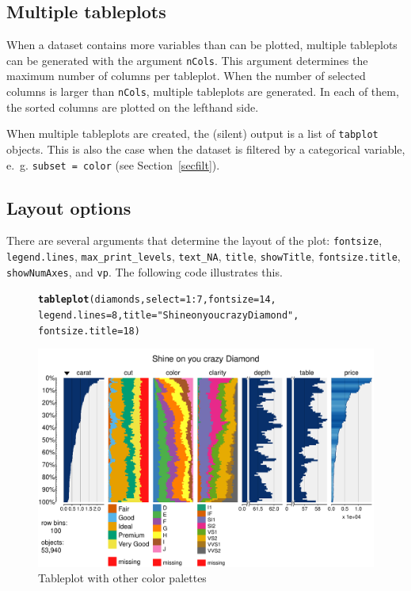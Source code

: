 \documentclass[11pt, fleqn, a4paper]{article}\usepackage{graphicx, color}
\makeatletter
\def\maxwidth{ %
  \ifdim\Gin@nat@width>\linewidth
    \linewidth
  \else
    \Gin@nat@width
  \fi
}
\newcommand{\hlfunctioncall}[1]{\textcolor[rgb]{0.501960784313725,0,0.329411764705882}{\textbf{#1}}}%
\newcommand{\hlstring}[1]{\textcolor[rgb]{0.6,0.6,1}{#1}}%
\newenvironment{kframe}{%
 \def\at@end@of@kframe{}%
 \ifinner\ifhmode%
  \def\at@end@of@kframe{\end{minipage}}%
  \begin{minipage}{\columnwidth}%
 \fi\fi%
 \def\FrameCommand##1{\hskip\@totalleftmargin \hskip-\fboxsep
 \colorbox{shadecolor}{##1}\hskip-\fboxsep
     \hskip-\linewidth \hskip-\@totalleftmargin \hskip\columnwidth}%
 \MakeFramed {\advance\hsize-\width
   \@totalleftmargin\z@ \linewidth\hsize
   \@setminipage}}%
 {\par\unskip\endMakeFramed%
 \at@end@of@kframe}
\newenvironment{knitrout}{}{} %
\makeatother
\begin{document}
\subsection{Multiple tableplots}\label{secmult}

When a dataset contains more variables than can be plotted, multiple tableplots can be generated with the argument {\tt nCols}. This argument determines the maximum number of columns per tableplot. When the number of selected columns is larger than {\tt nCols}, multiple tableplots are generated. In each of them, the sorted columns are plotted on the lefthand side. 

When multiple tableplots are created, the (silent) output is a list of {\tt tabplot} objects. This is also the case when the dataset is filtered by a categorical variable, e.~g. {\tt subset = color}
(see Section~\ref{secfilt}).

\subsection{Layout options}\label{seclay}
There are several arguments that determine the layout of the plot:
{\tt fontsize}, {\tt legend.lines}, {\tt max_print_levels}, {\tt text_NA}, {\tt title}, {\tt showTitle}, {\tt fontsize.title}, {\tt showNumAxes}, and {\tt vp}. The following code illustrates this.

\begin{figure}[htp]
\begin{knitrout}
\color{fgcolor}\begin{kframe}
\begin{alltt}
\hlfunctioncall{tableplot}(diamonds, select = 1:7, fontsize = 14, 
    legend.lines = 8, title = \hlstring{"Shine on you crazy Diamond"}, 
    fontsize.title = 18)
\end{alltt}
\end{kframe}
\includegraphics[width=\maxwidth]{figure/chunk10} 

\end{knitrout}

\caption{Tableplot with other color palettes}
\label{fig:tp6}
\end{figure}
\end{document}
